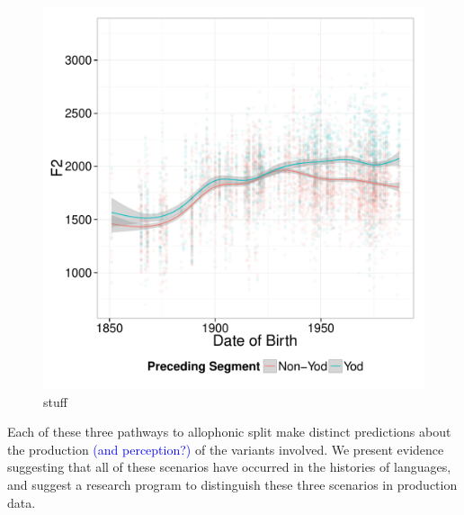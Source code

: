 \documentclass[a4paper,aps,prl,12pt,tightenlines,superscriptaddress]{revtex4}
\begin{document}
\begin{figure}
\begin{center}
\includegraphics[width=.7\textwidth]{ByTokenOldPreceding.pdf}
\end{center}
\caption{stuff}
\label{newzeaFig}
\end{figure}


Each of these three pathways to allophonic split make distinct predictions about the production \textcolor{blue}{(and perception?)} of the variants involved. We present evidence suggesting that all of these scenarios have occurred in the histories of languages, and suggest a research program to distinguish these three scenarios in production data. 


 

\end{document}

